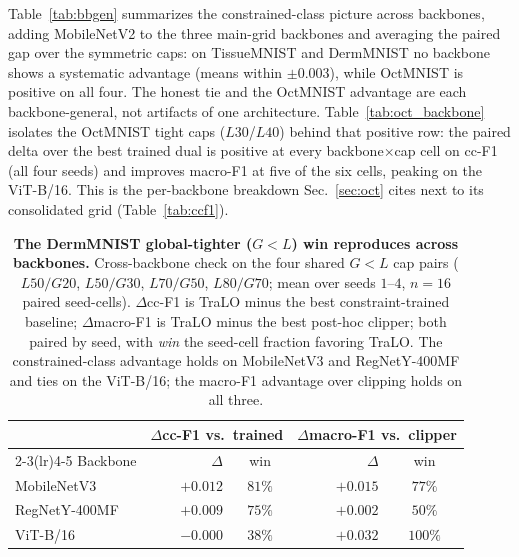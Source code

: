 \documentclass[10pt]{article}
\begin{document}
Table~\ref{tab:bbgen} summarizes the constrained-class picture across
backbones, adding MobileNetV2 to the three main-grid backbones and
averaging the paired gap over the symmetric caps: on TissueMNIST and
DermMNIST no backbone shows a systematic advantage (means within
$\pm0.003$), while OctMNIST is positive on all four. The honest tie
and the OctMNIST advantage are each backbone-general, not artifacts of
one architecture. Table~\ref{tab:oct_backbone} isolates the OctMNIST
tight caps ($L30$/$L40$) behind that positive row: the paired delta
over the best trained dual is positive at every backbone$\times$cap
cell on cc-F1 (all four seeds) and improves macro-F1 at five of the
six cells, peaking on the ViT-B/16. This is the per-backbone breakdown
Sec.~\ref{sec:oct} cites next to its consolidated grid
(Table~\ref{tab:ccf1}).







\begin{table}[t]\centering\small
\setlength{\tabcolsep}{5pt}
\caption{\textbf{The DermMNIST global-tighter ($G{<}L$) win reproduces
across backbones.} Cross-backbone check on the four shared $G{<}L$
cap pairs ($L50/G20$, $L50/G30$, $L70/G50$, $L80/G70$; mean over
seeds $1$--$4$, $n{=}16$ paired seed-cells). $\Delta$cc-F1 is TraLO
minus the best constraint-trained baseline; $\Delta$macro-F1 is TraLO
minus the best post-hoc clipper; both paired by seed, with \emph{win}
the seed-cell fraction favoring TraLO. The constrained-class advantage
holds on MobileNetV3 and RegNet{\color{blue}Y-400MF} and ties on the ViT{\color{blue}-B/16}; the macro-F1
advantage over clipping holds on all three.}
\label{tab:asym_xbackbone}
\setlength{\tabcolsep}{4pt}\small
\begin{tabular}{l rc rc}
\toprule
 & \multicolumn{2}{c}{$\Delta$cc-F1 vs.\ trained} & \multicolumn{2}{c}{$\Delta$macro-F1 vs.\ clipper} \\
\cmidrule(lr){2-3}\cmidrule(lr){4-5}
Backbone & $\Delta$ & win & $\Delta$ & win \\
\midrule
MobileNetV3    & $+0.012$ & $81\%$  & $+0.015$ & $77\%$ \\
RegNetY-400MF  & $+0.009$ & $75\%$  & $+0.002$ & $50\%$ \\
ViT-B/16       & $-0.000$ & $38\%$  & $+0.032$ & $100\%$ \\
\bottomrule
\end{tabular}
\end{table}
\end{document}
